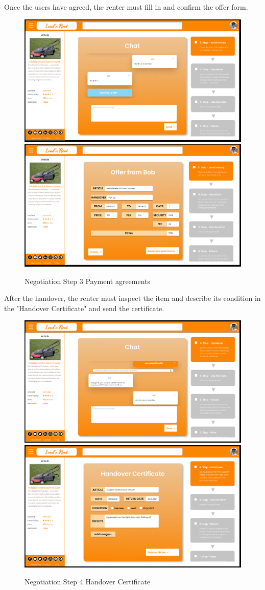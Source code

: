 \noindent
Once the users have agreed, the renter must fill in and confirm the offer form.

\begin{figure}[H]
	\centering
	\includegraphics[width=0.49\linewidth]{abb/13step3}
	\includegraphics[width=0.49\linewidth]{abb/14step3con}
	\caption{Negotiation Step 3 Payment agreements}
	\label{fig:Negotiation2}
	\centering
\end{figure}

\noindent
After the handover, the renter must inspect the item and describe its condition in the "Handover Certificate" and send the certificate.

\begin{figure}[H]
	\centering
	\includegraphics[width=0.49\linewidth]{abb/15step4}
	\includegraphics[width=0.49\linewidth]{abb/16step4con}
	\caption{Negotiation Step 4 Handover Certificate}
	\label{fig:Negotiation3}
	\centering
\end{figure}

